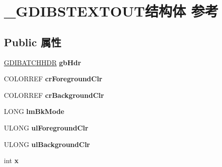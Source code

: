 \hypertarget{struct___g_d_i_b_s_t_e_x_t_o_u_t}{}\section{\+\_\+\+G\+D\+I\+B\+S\+T\+E\+X\+T\+O\+U\+T结构体 参考}
\label{struct___g_d_i_b_s_t_e_x_t_o_u_t}
\subsection*{Public 属性}
\begin{DoxyCompactItemize}
\item 
\mbox{\label{struct___g_d_i_b_s_t_e_x_t_o_u_t_afd60bf2cb25a4aa838d280096e4ff4b6}} 
\hyperlink{struct___g_d_i_b_a_t_c_h_h_d_r}{G\+D\+I\+B\+A\+T\+C\+H\+H\+DR} {\bfseries gb\+Hdr}
\item 
\mbox{\label{struct___g_d_i_b_s_t_e_x_t_o_u_t_ab775fd235a935f15ecabace2c7531691}} 
C\+O\+L\+O\+R\+R\+EF {\bfseries cr\+Foreground\+Clr}
\item 
\mbox{\label{struct___g_d_i_b_s_t_e_x_t_o_u_t_add7c3d7ab901bc1bdc5a2652cd431237}} 
C\+O\+L\+O\+R\+R\+EF {\bfseries cr\+Background\+Clr}
\item 
\mbox{\label{struct___g_d_i_b_s_t_e_x_t_o_u_t_aeb69c77eb362519448313efc110ea6bd}} 
L\+O\+NG {\bfseries lm\+Bk\+Mode}
\item 
\mbox{\label{struct___g_d_i_b_s_t_e_x_t_o_u_t_ad9278c5a2d2e2d39b417fce061bf3362}} 
U\+L\+O\+NG {\bfseries ul\+Foreground\+Clr}
\item 
\mbox{\label{struct___g_d_i_b_s_t_e_x_t_o_u_t_afb5c899aa699f416d22dbe3a34ba7b17}} 
U\+L\+O\+NG {\bfseries ul\+Background\+Clr}
\item 
\mbox{\label{struct___g_d_i_b_s_t_e_x_t_o_u_t_ad5201dafd58d1d2f842cbce7780d8377}} 
int {\bfseries x}
\item 
\mbox{\label{struct___g_d_i_b_s_t_e_x_t_o_u_t_ad35206450a8bf8b28a4e3774f7d5cf2f}} 

\end{DoxyCompactItemize}
